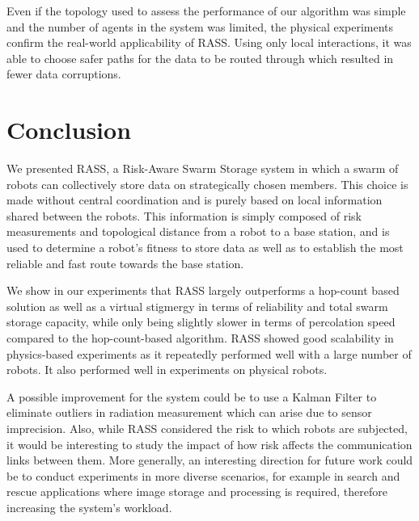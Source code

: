 Even if the topology used to assess the performance of our algorithm was simple and the number of agents in the system was limited, the physical experiments confirm the real-world applicability of \ac{RASS}. Using only local interactions, it was able to choose safer paths for the data to be routed through which resulted in fewer data corruptions.

\FloatBarrier

\section{Conclusion}
\label{conclusion}

We presented \ac{RASS}, a Risk-Aware Swarm Storage system in which a swarm of robots can collectively store data on strategically chosen members. This choice is made without central coordination and is purely based on local information shared between the robots. This information is simply composed of risk measurements and topological distance from a robot to a base station, and is used to determine a robot's fitness to store data as well as to establish the most reliable and fast route towards the base station.

We show in our experiments that \ac{RASS} largely outperforms a hop-count based solution as well as a virtual stigmergy in terms of reliability and total swarm storage capacity, while only being slightly slower in terms of percolation speed compared to the hop-count-based algorithm. \ac{RASS} showed good scalability in physics-based experiments as it repeatedly performed well with a large number of robots. It also performed well in experiments on physical robots.

 A possible improvement for the system could be to use a Kalman Filter \cite{kalman1960new} to eliminate outliers in radiation measurement which can arise due to sensor imprecision. Also, while \ac{RASS} considered the risk to which robots are subjected, it would be interesting to study the impact of how risk affects the communication links between them. More generally, an interesting direction for future work could be to conduct experiments in more diverse scenarios, for example in search and rescue applications where image storage and processing is required, therefore increasing the system's workload.
